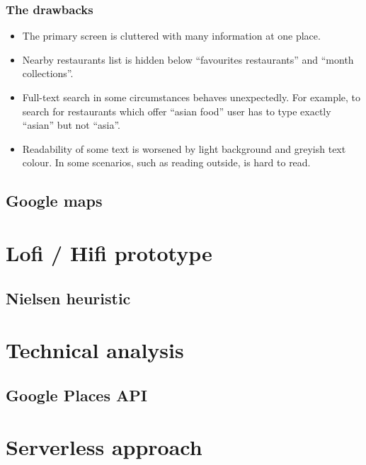 \subsubsection{The drawbacks}
\begin{itemize}
    \item The primary screen is cluttered with many information at one place.
    \item Nearby restaurants list is hidden below ``favourites restaurants'' and ``month collections''.
    \item Full-text search in some circumstances behaves unexpectedly. For example, to search for restaurants which offer ``asian food'' user has to type exactly ``asian'' but not ``asia''.
    \item Readability of some text is worsened by light background and greyish text colour. In some scenarios, such as reading outside, is hard to read.
\end{itemize}

\subsection{Google maps}

\section{Lofi / Hifi prototype}


\subsection{Nielsen heuristic}

\section{Technical analysis}

\subsection{Google Places API}

\section{Serverless approach }

\blind[2]



